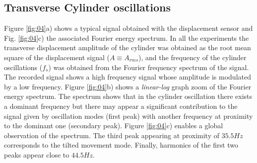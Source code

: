 \documentclass[review]{elsarticle}
\begin{document}
\subsection*{Transverse Cylinder oscillations}

Figure \ref{fig:04}a) shows a typical signal obtained with the displacement sensor and Fig. \ref{fig:04}c) the associated Fourier energy spectrum. In all the experiments the transverse displacement amplitude of the cylinder was obtained as the root mean square of the displacement signal ($A \equiv A_{rms}$), and the frequency of the cylinder oscillations ($f_s$) was obtained from the Fourier frequency spectrum of the signal. The recorded signal shows a high frequency signal whose amplitude is modulated by a low frequency. Figure \ref{fig:04}b) shows a {\it linear-log} graph zoom of the Fourier energy spectrum. The spectrum shows that in the cylinder oscillation there exists a dominant frequency but there may appear a significant contribution to the signal given by oscillation modes (first peak) with another frequency at proximity to the dominant one (secondary peak). Figure \ref{fig:04}c) enables a global observation of the spectrum. The third peak appearing at proximity of $35.5Hz$ corresponds to the tilted movement mode. Finally, harmonics of the first two peaks appear close to $44.5Hz$.
\end{document}
